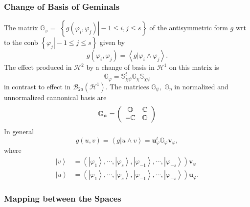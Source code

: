 \documentclass[aps,preprint]{revtex4}%
\begin{document}
\subsubsection{Change of Basis of Geminals}

The matrix $\mathbb{G}_{\varphi}=$ $\left\{  \left.  g\left(  \varphi
_{i},\varphi_{j}\right)  \right\vert -1\leq i,j\leq s\right\}  $ of the
antisymmetric form $g$ wrt to the conb $\left\{  \left.  \varphi
_{j}\right\vert -1\leq j\leq s\right\}  $ given by
\begin{equation}
g\left(  \varphi_{i},\varphi_{j}\right)  =\left\langle \left.  g\right\vert
\varphi_{i}\wedge\varphi_{j}\right\rangle .
\end{equation}
The effect produced in $\mathcal{H}^{2}$ by a change of basis in
$\mathcal{H}^{1}$ on this matrix is
\begin{equation}
\mathbb{G}_{\varphi}=\mathbb{S}_{\chi\psi}^{t}\mathbb{G}_{\chi}\mathbb{S}%
_{\chi\psi}%
\end{equation}
in contrast to effect in $\mathcal{B}_{2a}\left(  \mathcal{H}^{1}\right)  .$
The matrices $\mathbb{G}_{\psi},$ $\mathbb{G}_{\eta}$ in normalized and
unnormalized cannonical basis are
\begin{equation}
\mathbb{G}_{\psi}=\left(
\begin{array}
[c]{cc}%
\mathbb{O} & \mathbb{C}\\
-\mathbb{C} & \mathbb{O}%
\end{array}
\right)
\end{equation}
In general
\begin{equation}
g\left(  u,v\right)  =\left\langle \left.  g\right\vert u\wedge v\right\rangle
=\mathbf{u}_{\varphi}^{t}\mathbb{G}_{\varphi}\mathbf{v}_{\varphi}\mathbf{,}%
\end{equation}
where
\begin{align}
\left\vert v\right\rangle  &  =\left(  \left\vert \varphi_{1}\right\rangle
,\cdots,\left\vert \varphi_{s}\right\rangle ,\left\vert \varphi_{-1}%
\right\rangle ,\cdots,\left\vert \varphi_{-s}\right\rangle \right)
\mathbf{v}_{\varphi}\\
\left\vert u\right\rangle  &  =\left(  \left\vert \varphi_{1}\right\rangle
,\cdots,\left\vert \varphi_{s}\right\rangle ,\left\vert \varphi_{-1}%
\right\rangle ,\cdots,\left\vert \varphi_{-s}\right\rangle \right)
\mathbf{u}_{\varphi}.
\end{align}


\subsubsection{Mapping between the Spaces}
\end{document}
